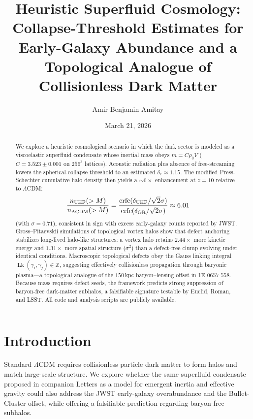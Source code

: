 \documentclass[reprint,amsmath,amssymb,aps,prl,superscriptaddress]{revtex4-2}
\begin{document}
\title{Heuristic Superfluid Cosmology: Collapse-Threshold Estimates for Early-Galaxy Abundance and a Topological Analogue of Collisionless Dark Matter}

\author{Amir Benjamin Amitay}

\date{March 21, 2026}

\begin{abstract}
We explore a heuristic cosmological scenario in which the dark sector is modeled as a viscoelastic superfluid condensate whose inertial mass obeys $m=C\rho_0V$ ($C=3.523\pm0.001$ on $256^3$ lattices). Acoustic radiation plus absence of free-streaming lowers the spherical-collapse threshold to an estimated $\delta_c\approx1.15$. The modified Press-Schechter cumulative halo density then yields a ${\sim}6\times$ enhancement at $z=10$ relative to $\Lambda$CDM:
\[
\frac{n_{\rm UHF}(>M)}{n_{\Lambda{\rm CDM}}(>M)}=\frac{\operatorname{erfc}(\delta_{\rm UHF}/\sqrt{2}\sigma)}{\operatorname{erfc}(\delta_{\rm GR}/\sqrt{2}\sigma)}\approx6.01
\]
(with $\sigma=0.71$), consistent in sign with excess early-galaxy counts reported by JWST.
Gross--Pitaevskii simulations of topological vortex halos show that defect anchoring stabilizes long-lived halo-like structures: a vortex halo retains $2.44\times$ more kinetic energy and $1.31\times$ more spatial structure ($\sigma^2$) than a defect-free clump evolving under identical conditions.
Macroscopic topological defects obey the Gauss linking integral $\operatorname{Lk}(\gamma_i,\gamma_j)\in\mathbb{Z}$, suggesting effectively collisionless propagation through baryonic plasma---a topological analogue of the $150\,\text{kpc}$ baryon--lensing offset in 1E 0657-558. Because mass requires defect seeds, the framework predicts strong suppression of baryon-free dark-matter subhalos, a falsifiable signature testable by Euclid, Roman, and LSST. All code and analysis scripts are publicly available.
\end{abstract}

\maketitle

\section{Introduction}
\label{sec:intro}

Standard $\Lambda$CDM requires collisionless particle dark matter to form halos and match large-scale structure. We explore whether the same superfluid condensate proposed in companion Letters as a model for emergent inertia and effective gravity could also address the JWST early-galaxy overabundance and the Bullet-Cluster offset, while offering a falsifiable prediction regarding baryon-free subhalos.
\end{document}
